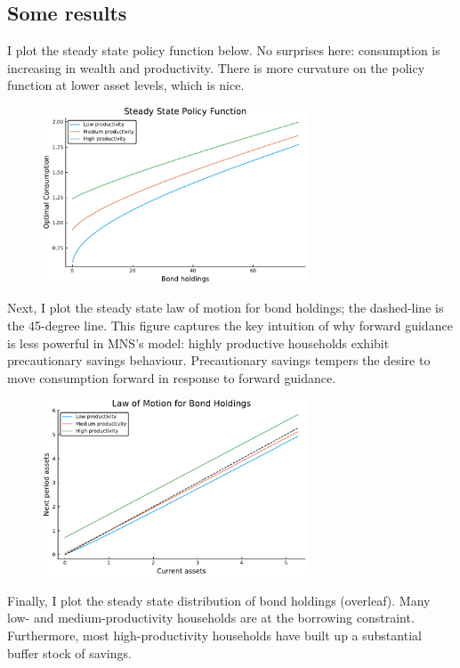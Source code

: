 \documentclass[12pt]{article}
\begin{document}
\subsection{Some results}
I plot the steady state policy function below. No surprises here: consumption is increasing in wealth and productivity. There is more curvature on the policy function at lower asset levels, which is nice.
\begin{figure}[htpb!]
 \centering
        \includegraphics[width=0.7\textwidth]{pol_fn_C.pdf}
\end{figure}

Next, I plot the steady state law of motion for bond holdings; the dashed-line is the 45-degree line. This figure captures the key intuition of why forward guidance is less powerful in MNS's model: highly productive households exhibit precautionary savings behaviour. Precautionary savings tempers the desire to move consumption forward in response to forward guidance.

\begin{figure}[htpb!]
 \centering
        \includegraphics[width=0.7\textwidth]{pol_fn_B.pdf}
\end{figure}

Finally, I plot the steady state distribution of bond holdings (overleaf). Many low- and medium-productivity households are at the borrowing constraint. Furthermore, most high-productivity households have built up a substantial buffer stock of savings.
\end{document}
